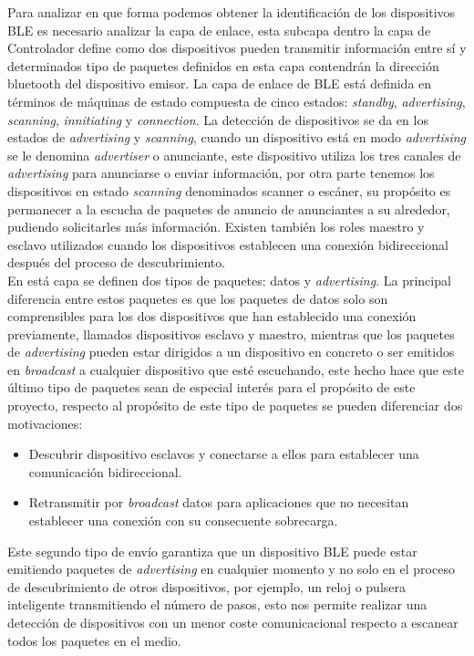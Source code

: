 \documentclass[../proyecto.tex]{subfiles}
\begin{document}
Para analizar en que forma podemos obtener la identificación de los dispositivos BLE es necesario analizar la capa de enlace, esta subcapa dentro la capa de Controlador define como dos dispositivos pueden transmitir información entre sí y determinados tipo de paquetes definidos en esta capa contendrán la dirección bluetooth del dispositivo emisor. La capa de enlace de BLE está definida en términos de máquinas de estado compuesta de cinco estados:  \textit{standby},  \textit{advertising},  \textit{scanning},  \textit{innitiating} y  \textit{connection}. La detección de dispositivos se da en los estados de \textit{advertising} y \textit{scanning}, cuando un dispositivo está en modo \textit{advertising} se le denomina \textit{advertiser} o anunciante, este dispositivo utiliza los tres canales de \textit{advertising} para anunciarse o enviar información, por otra parte tenemos los dispositivos en estado  \textit{scanning} denominados scanner o escáner, su propósito es permanecer a la escucha de paquetes de anuncio de anunciantes a su alrededor, pudiendo solicitarles más información. Existen también los roles maestro y esclavo utilizados cuando los dispositivos establecen una conexión bidireccional después del proceso de descubrimiento.\\

En está capa se definen dos tipos de paquetes: datos y \textit{advertising}. La principal diferencia entre estos paquetes es que los paquetes de datos solo son comprensibles para los dos dispositivos que han establecido una conexión previamente, llamados dispositivos esclavo y maestro, mientras que los paquetes de \textit{advertising} pueden estar dirigidos a un dispositivo en concreto o ser emitidos en \textit{broadcast} a cualquier dispositivo que esté escuchando, este hecho hace que este último tipo de paquetes sean de especial interés para el propósito de este proyecto, respecto al propósito de este tipo de paquetes se pueden diferenciar dos motivaciones:\\

\begin{itemize}
  \item Descubrir dispositivo esclavos y conectarse a ellos para establecer una comunicación bidireccional.
  \item Retransmitir por \textit{broadcast} datos para aplicaciones que no necesitan establecer una conexión con su consecuente sobrecarga.
\end{itemize}

Este segundo tipo de envío garantiza que un dispositivo BLE puede estar emitiendo paquetes de \textit{advertising} en cualquier momento y no solo en el proceso de descubrimiento de otros dispositivos, por ejemplo, un reloj o pulsera inteligente transmitiendo el número de pasos, esto nos permite realizar una detección de dispositivos con un menor coste comunicacional respecto a escanear todos los paquetes en el medio.\\
\end{document}
